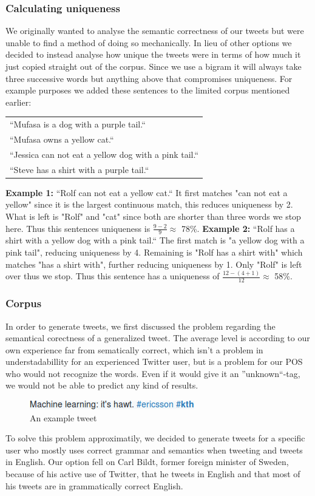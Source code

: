 \documentclass[a4paper,12pt]{article}
\begin{document}
\subsubsection{Calculating uniqueness}
We originally wanted to analyse the semantic correctness of our tweets but were unable to find a method of doing so mechanically. In lieu of other options we decided to instead analyse how unique the tweets were in terms of how much it just copied straight out of the corpus.
Since we use a bigram it will always take three successive words but anything above that compromises uniqueness.
For example purposes we added these sentences to the limited corpus mentioned earlier:
\begin{tabular}{l}
``Mufasa is a dog with a purple tail.``\\
``Mufasa owns a yellow cat.``\\
``Jessica can not eat a yellow dog with a pink tail.``\\
``Steve has a shirt with a purple tail.``\\
\end{tabular}
\textbf{Example 1:} ``Rolf can not eat a yellow cat.``
It first matches "can not eat a yellow" since it is the largest continuous match, this reduces uniqueness by 2. What is left is "Rolf" and "cat" since both are shorter than three words we stop here.
Thus this sentences uniqueness is $\frac{9 - 2}{9} \approx$ 78\%.
\textbf{Example 2:} ``Rolf has a shirt with a yellow dog with a pink tail.``
The first match is "a yellow dog with a pink tail", reducing uniqueness by 4. Remaining is "Rolf has a shirt with" which matches "has a shirt with", further reducing uniqueness by 1. Only "Rolf" is left over thus we stop.
Thus this sentence has a uniqueness of $\frac{12 - (4 + 1)}{12} \approx$ 58\%.
\subsubsection{Corpus}
In order to generate tweets, we first discussed the problem regarding the semantical corectness of a generalized tweet.
The average level is according to our own experience far from sematically correct, which isn't a problem in understadabillity for an experienced Twitter user,
but is a problem for our POS who would not recognize the words. Even if it would give it an ''unknown``-tag, we would not be able to predict any kind of results.
\begin{figure}[h!]
\centering
\includegraphics[width=1\linewidth]{machine_learning}
\caption{An example tweet}
\end{figure}
To solve this problem approximatily, we decided to generate tweets for a specific user who mostly uses correct grammar and semantics when tweeting and tweets in English.
Our option fell on Carl Bildt, former foreign minister of Sweden, because of his active use of Twitter,
that he tweets in English and that most of his tweets are in grammatically correct English.
\end{document}
